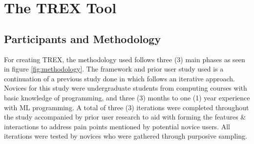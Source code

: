 \documentclass{sigchi-ext}
\begin{document}
\section{The TREX Tool}
\subsection{Participants and Methodology}
For creating TREX, the methodology used follows three (3) main phases as seen in figure \ref{fig:methodology}. The framework and prior user study used is a continuation of a previous study done in \cite{nodalo2019building} which follows an iterative approach. 
Novices for this study were undergraduate students from computing courses with basic knowledge of programming, and three (3) months to one (1) year experience with ML programming. A total of three (3) iterations were completed throughout the study accompanied by prior user research to aid with forming the features \& interactions to address pain points mentioned by potential novice users. All iterations were tested by novices who were gathered through purposive sampling. 

\end{document}
